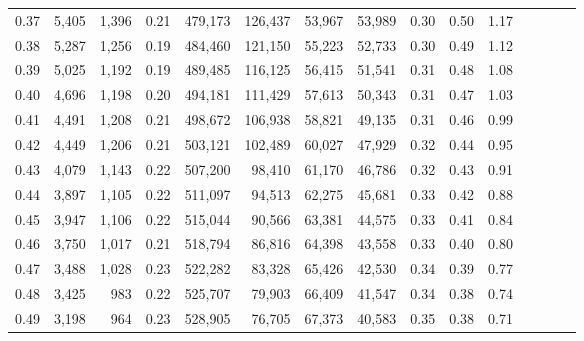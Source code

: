 \begin{tabular}{rrrcrrrrrrrrrrr}
0.37 &   5,405 &   1,396 &                                       0.21 &  479,173 &  126,437 &   53,967 &   53,989 &  0.30 &  0.50 &                         1.17 \\
0.38 &   5,287 &   1,256 &                                       0.19 &  484,460 &  121,150 &   55,223 &   52,733 &  0.30 &  0.49 &                         1.12 \\
0.39 &   5,025 &   1,192 &                                       0.19 &  489,485 &  116,125 &   56,415 &   51,541 &  0.31 &  0.48 &                         1.08 \\
0.40 &   4,696 &   1,198 &                                       0.20 &  494,181 &  111,429 &   57,613 &   50,343 &  0.31 &  0.47 &                         1.03 \\
0.41 &   4,491 &   1,208 &                                       0.21 &  498,672 &  106,938 &   58,821 &   49,135 &  0.31 &  0.46 &                         0.99 \\
0.42 &   4,449 &   1,206 &                                       0.21 &  503,121 &  102,489 &   60,027 &   47,929 &  0.32 &  0.44 &                         0.95 \\
0.43 &   4,079 &   1,143 &                                       0.22 &  507,200 &   98,410 &   61,170 &   46,786 &  0.32 &  0.43 &                         0.91 \\
0.44 &   3,897 &   1,105 &                                       0.22 &  511,097 &   94,513 &   62,275 &   45,681 &  0.33 &  0.42 &                         0.88 \\
0.45 &   3,947 &   1,106 &                                       0.22 &  515,044 &   90,566 &   63,381 &   44,575 &  0.33 &  0.41 &                         0.84 \\
0.46 &   3,750 &   1,017 &                                       0.21 &  518,794 &   86,816 &   64,398 &   43,558 &  0.33 &  0.40 &                         0.80 \\
0.47 &   3,488 &   1,028 &                                       0.23 &  522,282 &   83,328 &   65,426 &   42,530 &  0.34 &  0.39 &                         0.77 \\
0.48 &   3,425 &     983 &                                       0.22 &  525,707 &   79,903 &   66,409 &   41,547 &  0.34 &  0.38 &                         0.74 \\
0.49 &   3,198 &     964 &                                       0.23 &  528,905 &   76,705 &   67,373 &   40,583 &  0.35 &  0.38 &                         0.71 \\

\end{tabular}
